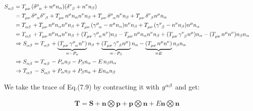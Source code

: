 \documentclass[12pt]{article}
\renewcommand{\vec}[1]{\bm{#1}}
\numberwithin{equation}{section}
\numberwithin{theorem}{subsection}
\begin{document}
\begin{align}

    \tensor{S}{_\alpha_\beta} &= \tensor{T}{_\mu_\nu}(\tensor{\delta}{^\mu_\alpha} + n^{\mu}n_{\alpha}) (\tensor{\delta}{^\nu_\beta}+n^{\nu}n_{\beta}) \notag \\  &= \tensor{T}{_\mu_\nu}\tensor{\delta}{^\mu_\alpha}\tensor{\delta}{^\nu_\beta} + \tensor{T}{_\mu_\nu}n^{\mu}n_{\alpha}n^{\nu}n_{\beta} +  \tensor{T}{_\mu_\nu}\tensor{\delta}{^\mu_\alpha}n^{\nu}n_{\beta}+\tensor{T}{_\mu_\nu}\tensor{\delta}{^\nu_\beta}n^{\mu}n_{\alpha} \notag \\ &= \tensor{T}{_\alpha_\beta} + \tensor{T}{_\mu_\nu}n^{\mu}n_{\alpha}n^{\nu}n_{\beta} + \tensor{T}{_\mu_\nu}(\tensor{\gamma}{^\mu_\alpha}-n^{\mu}n_{\alpha})n^{\nu}n_{\beta} + \tensor{T}{_\mu_\nu}(\tensor{\gamma}{^\nu_\beta}-n^{\nu}n_{\beta})n^{\mu}n_{\alpha} \notag \\ &= \tensor{T}{_\alpha_\beta} + \tensor{T}{_\mu_\nu}n^{\mu}n_{\alpha}n^{\nu}n_{\beta} + (\tensor{T}{_\mu_\nu}\tensor{\gamma}{^\mu_\alpha}n^{\nu})n_{\beta} - \tensor{T}{_\mu_\nu}n^{\mu}n_{\alpha}n^{\nu}n_{\beta} + (\tensor{T}{_\mu_\nu}\tensor{\gamma}{^\nu_\beta}n^{\mu})n_{\alpha} - (\tensor{T}{_\mu_\nu}n^{\mu}n^{\nu})n_{\beta}n_{\alpha} \notag \\

    &\Rightarrow \tensor{S}{_\alpha_\beta} = \tensor{T}{_\alpha_\beta} + \underbrace{(\tensor{T}{_\mu_\nu}\tensor{\gamma}{^\mu_\alpha}n^{\nu})}_{=-P_{\alpha}}n_{\beta} + \underbrace{(\tensor{T}{_\mu_\nu}\tensor{\gamma}{^\nu_\beta}n^{\mu})}_{=-P_{\beta}}n_{\alpha} - \underbrace{(\tensor{T}{_\mu_\nu}n^{\mu}n^{\nu})}_{= E}n_{\beta}n_{\alpha} \notag \\ &\Rightarrow \tensor{S}{_\alpha_\beta} = \tensor{T}{_\alpha_\beta} - P_{\alpha}n_{\beta} - P_{\beta}n_{\alpha}- E \, n_{\beta}n_{\alpha}  \notag \\ &\Rightarrow \tensor{T}{_\alpha_\beta} = \tensor{S}{_\alpha_\beta} + P_{\alpha}n_{\beta} + P_{\beta}n_{\alpha} +

    E n_{\alpha}n_{\beta}

\end{align}

We take the trace of Eq.(7.9) by contracting it with $\tensor{g}{^\alpha^\beta}$ and get:

\begin{align*}

  \vec{T} = \vec{S} + \vec{n} \bigotimes \vec{p} +\vec{p} \bigotimes \vec{n} + E \vec{n} \bigotimes \vec{n}

\end{align*}
\end{document}
